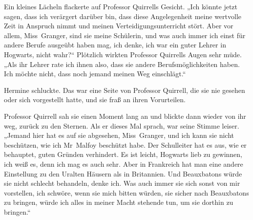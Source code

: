 Ein kleines Lächeln flackerte auf Professor Quirrells Gesicht.
„Ich könnte jetzt sagen, dass ich verärgert darüber bin, dass diese Angelegenheit meine wertvolle Zeit in Anspruch nimmt und meinen Verteidigungsunterricht stört. Aber vor allem, Miss~Granger, sind sie meine Schülerin, und was auch immer ich einst für andere Berufe ausgeübt haben mag, ich denke, ich war ein guter Lehrer in Hogwarts, nicht wahr?“ Plötzlich wirkten Professor Quirrells Augen sehr müde.
„Als ihr Lehrer rate ich ihnen also, dass sie andere Berufsmöglichkeiten haben. Ich möchte nicht, dass noch jemand meinen Weg einschlägt.“

Hermine schluckte. Das war eine Seite von Professor Quirrell, die sie nie gesehen oder sich vorgestellt hatte, und sie fraß an ihren Vorurteilen.

Professor Quirrell sah sie einen Moment lang an und blickte dann wieder von ihr weg, zurück zu den Sternen. Als er dieses Mal sprach, war seine Stimme leiser.
„Jemand hier hat es auf sie abgesehen, Miss~Granger, und ich kann sie nicht beschützen, wie ich Mr~Malfoy beschützt habe. Der Schulleiter hat es aus, wie er behauptet, guten Gründen verhindert. Es ist leicht, Hogwarts lieb zu gewinnen, ich weiß es, denn ich mag es auch sehr. Aber in Frankreich hat man eine andere Einstellung zu den Uralten Häusern als in Britannien. Und Beauxbatons würde sie nicht schlecht behandeln, denke ich. Was auch immer sie sich sonst von mir vorstellen, ich schwöre, wenn sie mich bitten würden, sie sicher nach Beauxbatons zu bringen, würde ich alles in meiner Macht stehende tun, um sie dorthin zu bringen.“

